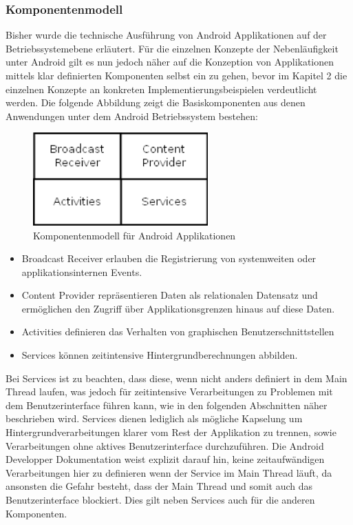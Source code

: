 \documentclass[12pt,oneside,a4paper,bibtotoc,liststotoc]{scrreprt}
\begin{document}
\subsubsection{Komponentenmodell}
Bisher wurde die technische Ausführung von Android Applikationen auf der Betriebssystemebene erläutert. Für die einzelnen Konzepte der Nebenläufigkeit unter Android gilt es nun jedoch näher auf die Konzeption von Applikationen mittels klar definierten Komponenten selbst ein zu gehen, bevor im Kapitel 2 die einzelnen Konzepte an konkreten Implementierungsbeispielen verdeutlicht werden. Die folgende Abbildung zeigt die Basiskomponenten aus denen Anwendungen unter dem Android Betriebssystem bestehen:
\begin{figure}[H]
  \begin{centering}
    \includegraphics[width=0.6\textwidth]{img/Android_Komponent_Model.png}
    \caption{Komponentenmodell für Android Applikationen}
    \label{Android_Komponent_Model}
  \end{centering}
\end{figure}
\begin{itemize}
\item Broadcast Receiver erlauben die Registrierung von systemweiten oder applikationsinternen Events.
\item Content Provider repräsentieren Daten als relationalen Datensatz und ermöglichen den Zugriff über Applikationsgrenzen hinaus auf diese Daten.
\item Activities definieren das Verhalten von graphischen Benutzerschnittstellen
\item Services können zeitintensive Hintergrundberechnungen abbilden. 
\end{itemize}
Bei Services ist zu beachten, dass diese, wenn nicht anders definiert in dem Main Thread laufen, was jedoch für zeitintensive Verarbeitungen zu Problemen mit dem Benutzerinterface führen kann, wie in den folgenden Abschnitten näher beschrieben wird. Services dienen lediglich als mögliche Kapselung um Hintergrundverarbeitungen klarer vom Rest der Applikation zu trennen, sowie Verarbeitungen ohne aktives Benutzerinterface durchzuführen. Die Android Developper Dokumentation weist explizit darauf hin, keine zeitaufwändigen Verarbeitungen hier zu definieren wenn der Service im Main Thread läuft, da ansonsten die Gefahr besteht, dass der Main Thread und somit auch das Benutzerinterface blockiert. Dies gilt neben Services auch für die anderen Komponenten.
\end{document}
